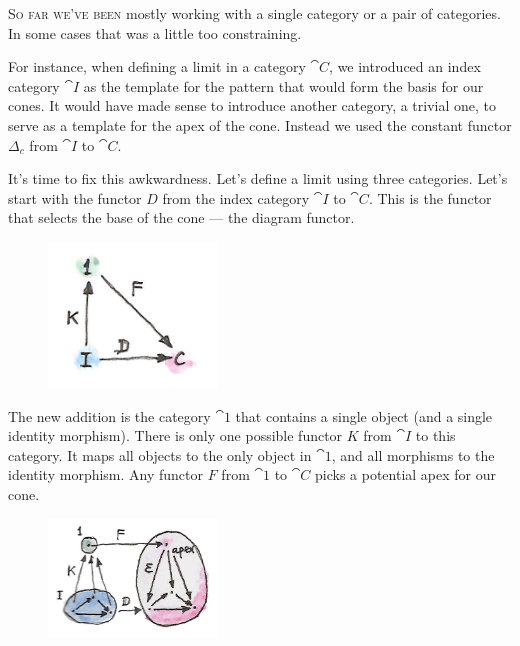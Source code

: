 
\lettrine[lhang=0.17]{S}{o far we've been} mostly working with a single category or a pair of
categories. In some cases that was a little too constraining.

For instance, when defining a limit in a category $\cat{C}$, we introduced an
index category $\cat{I}$ as the template for the pattern that would
form the basis for our cones. It would have made sense to introduce
another category, a trivial one, to serve as a template for the apex of
the cone. Instead we used the constant functor $\Delta_c$ from
$\cat{I}$ to $\cat{C}$.

It's time to fix this awkwardness. Let's define a limit using three
categories. Let's start with the functor $D$ from the index
category $\cat{I}$ to $\cat{C}$. This is the functor that selects the base
of the cone --- the diagram functor.

\begin{figure}[H]
  \centering
  \includegraphics[width=0.4\textwidth]{images/kan2.jpg}
\end{figure}

\noindent
The new addition is the category $\cat{1}$ that contains a single
object (and a single identity morphism). There is only one possible
functor $K$ from $\cat{I}$ to this category. It maps all objects
to the only object in $\cat{1}$, and all morphisms to the identity
morphism. Any functor $F$ from $\cat{1}$ to $\cat{C}$ picks a
potential apex for our cone.

\begin{figure}[H]
  \centering
  \includegraphics[width=0.4\textwidth]{images/kan15.jpg}
\end{figure}

